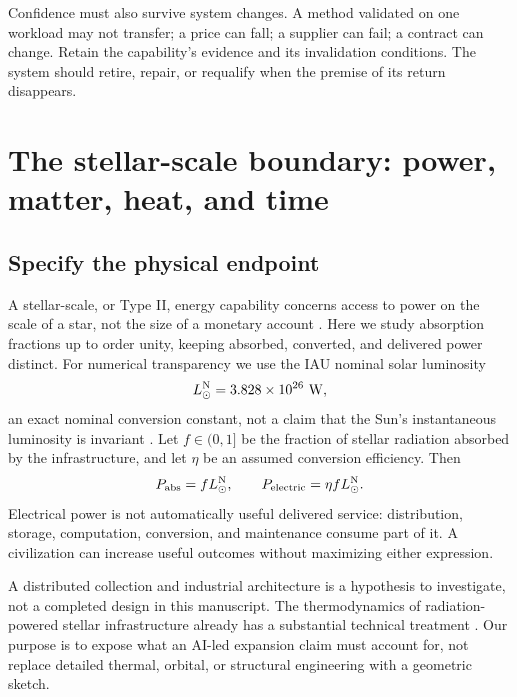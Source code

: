 \documentclass[11pt,letterpaper]{article}
\newcommand{\1}{\mathbf 1}
\theoremstyle{remark}\newtheorem{remark}{Remark}[section]
\begin{document}
Confidence must also survive system changes. A method validated on one workload may not transfer; a price can fall; a supplier can fail; a contract can change. Retain the capability's evidence and its invalidation conditions. The system should retire, repair, or requalify when the premise of its return disappears.

\section{The stellar-scale boundary: power, matter, heat, and time}\label{sec:stellar}
\subsection{Specify the physical endpoint}
A stellar-scale, or Type II, energy capability concerns access to power on the scale of a star, not the size of a monetary account \citep{kardashev}. Here we study absorption fractions up to order unity, keeping absorbed, converted, and delivered power distinct. For numerical transparency we use the IAU nominal solar luminosity
\begin{equation}
 L_\odot^{\rm N}=3.828\times10^{26}\ {\rm W},
\end{equation}
an exact nominal conversion constant, not a claim that the Sun's instantaneous luminosity is invariant \citep{iau2015}. Let $f\in(0,1]$ be the fraction of stellar radiation absorbed by the infrastructure, and let $\eta$ be an assumed conversion efficiency. Then
\begin{equation}\label{eq:power}
 P_{\rm abs}=fL_\odot^{\rm N},\qquad
 P_{\rm electric}=\eta fL_\odot^{\rm N}.
\end{equation}
Electrical power is not automatically useful delivered service: distribution, storage, computation, conversion, and maintenance consume part of it. A civilization can increase useful outcomes without maximizing either expression.

A distributed collection and industrial architecture is a hypothesis to investigate, not a completed design in this manuscript. The thermodynamics of radiation-powered stellar infrastructure already has a substantial technical treatment \citep{wright}. Our purpose is to expose what an AI-led expansion claim must account for, not replace detailed thermal, orbital, or structural engineering with a geometric sketch.
\end{document}
